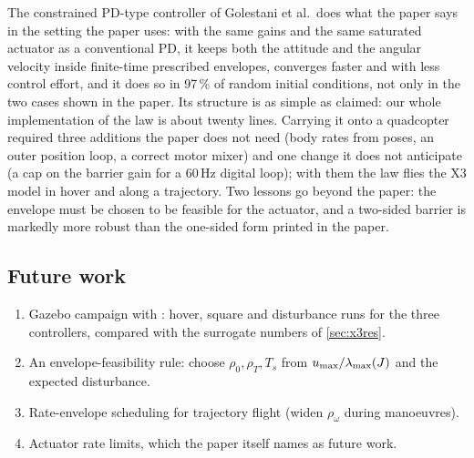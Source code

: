 The constrained PD-type controller of Golestani et al.\ does what the paper says in the setting the paper uses: with the
same gains and the same saturated actuator as a conventional PD, it keeps both the attitude and the angular velocity inside
finite-time prescribed envelopes, converges faster and with less control effort, and it does so in 97\,\% of random
initial conditions, not only in the two cases shown in the paper. Its structure is as simple as claimed: our whole
implementation of the law is about twenty lines. Carrying it onto a quadcopter required three additions the paper does
not need (body rates from poses, an outer position loop, a correct motor mixer) and one change it does not anticipate (a cap
on the barrier gain for a 60\,Hz digital loop); with them the law flies the X3 model in hover and along a trajectory.
Two lessons go beyond the paper: the envelope must be chosen to be feasible for the actuator, and a two-sided barrier
is markedly more robust than the one-sided form printed in the paper.

\subsection{Future work}
\begin{enumerate}[leftmargin=*]
  \item Gazebo campaign with : hover, square and disturbance runs for the three controllers, compared with the
        surrogate numbers of \cref{sec:x3res}.
  \item An envelope-feasibility rule: choose $\rho_0,\rho_T,T_s$ from $u_{\max}/\lambda_{\max}(J)$ and the expected disturbance.
  \item Rate-envelope scheduling for trajectory flight (widen $\rho_\omega$ during manoeuvres).
  \item Actuator rate limits, which the paper itself names as future work.
\end{enumerate}
